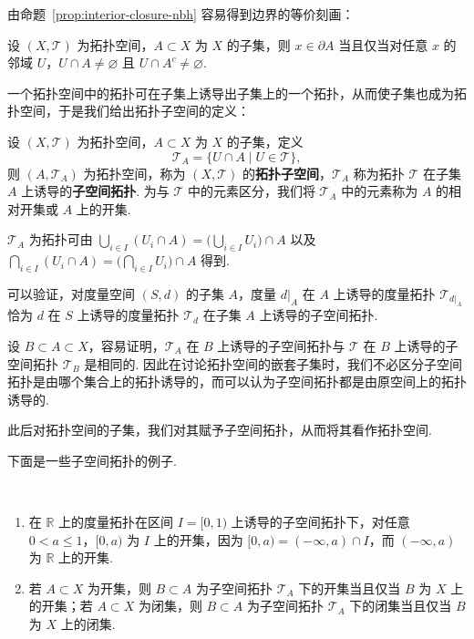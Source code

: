 \documentclass[../main.tex]{subfiles}
\begin{document}
由命题~\ref{prop:interior-closure-nbh} 容易得到边界的等价刻画：

\begin{proposition}[集合的边界的等价刻画]
    设 $(X, \mathcal{T})$ 为拓扑空间，$A \subset X$ 为 $X$ 的子集，则 $x \in \partial A$ 当且仅当对任意 $x$ 的邻域 $U$，$U \cap A \neq \varnothing$ 且 $U \cap A^c \neq \varnothing$. 
\end{proposition}

一个拓扑空间中的拓扑可在子集上诱导出子集上的一个拓扑，从而使子集也成为拓扑空间，于是我们给出拓扑子空间的定义：

\begin{definition}[拓扑子空间的定义]
    设 $(X, \mathcal{T})$ 为拓扑空间，$A \subset X$ 为 $X$ 的子集，定义 
    $$
    \mathcal{T}_A = \{U \cap A \mid U \in \mathcal{T}\}, 
    $$
    则 $(A, \mathcal{T}_A)$ 为拓扑空间，称为 $(X, \mathcal{T})$ 的\textbf{拓扑子空间}，$\mathcal{T}_A$ 称为拓扑 $\mathcal{T}$ 在子集 $A$ 上诱导的\textbf{子空间拓扑}. 为与 $\mathcal{T}$ 中的元素区分，我们将 $\mathcal{T}_A$ 中的元素称为 $A$ 的相对开集或 $A$ 上的开集. 
\end{definition}

\begin{remark} \label{rem:1.5.8}
    $\mathcal{T}_A$ 为拓扑可由 $\bigcup\limits_{i \in I} (U_i \cap A) = \big(\bigcup\limits_{i \in I} U_i\big) \cap A$ 以及 $\bigcap\limits_{i \in I} (U_i \cap A) = \big(\bigcap\limits_{i \in I} U_i\big) \cap A$ 得到. 

    可以验证，对度量空间 $(S, d)$ 的子集 $A$，度量 $d|_A$ 在 $A$ 上诱导的度量拓扑 $\mathcal{T}_{d|_A}$ 恰为 $d$ 在 $S$ 上诱导的度量拓扑 $\mathcal{T}_{d}$ 在子集 $A$ 上诱导的子空间拓扑. 

    设 $B \subset A \subset X$，容易证明，$\mathcal{T}_A$ 在 $B$ 上诱导的子空间拓扑与 $\mathcal{T}$ 在 $B$ 上诱导的子空间拓扑 $\mathcal{T}_B$ 是相同的. 因此在讨论拓扑空间的嵌套子集时，我们不必区分子空间拓扑是由哪个集合上的拓扑诱导的，而可以认为子空间拓扑都是由原空间上的拓扑诱导的. 
\end{remark}

此后对拓扑空间的子集，我们对其赋予子空间拓扑，从而将其看作拓扑空间. 

下面是一些子空间拓扑的例子. 

\begin{example}[子空间拓扑的例子]
    \ 
    \begin{enumerate}[label = (\alph*)]
        \item 在 $\mathbb R$ 上的度量拓扑在区间 $I = [0, 1)$ 上诱导的子空间拓扑下，对任意 $0 < a \leqslant 1$，$[0, a)$ 为 $I$ 上的开集，因为 $[0, a) = (-\infty, a) \cap I$，而 $(-\infty, a)$ 为 $\mathbb R$ 上的开集. 
        \item 若 $A \subset X$ 为开集，则 $B \subset A$ 为子空间拓扑 $\mathcal{T}_A$ 下的开集当且仅当 $B$ 为 $X$ 上的开集；若 $A \subset X$ 为闭集，则 $B \subset A$ 为子空间拓扑 $\mathcal{T}_A$ 下的闭集当且仅当 $B$ 为 $X$ 上的闭集. 
    \end{enumerate}
\end{example}
\end{document}
